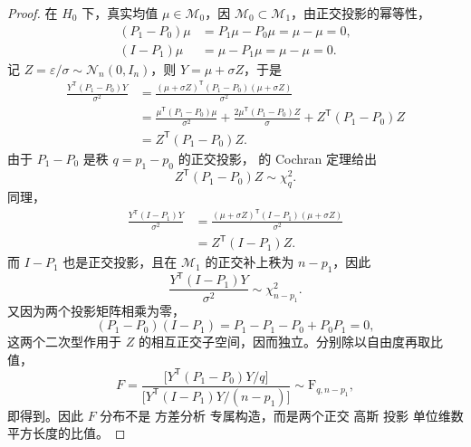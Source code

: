 \begin{proof}
在 $H_0$ 下，真实均值 $\mu\in\mathcal M_0$，因 $\mathcal M_0\subset\mathcal M_1$，由正交投影的幂等性，
\begin{align*}
(P_1-P_0)\mu&=P_1\mu-P_0\mu=\mu-\mu=0,\\
(I-P_1)\mu&=\mu-P_1\mu=\mu-\mu=0.
\end{align*}
记 $Z=\varepsilon/\sigma\sim\mathcal N_n(0,I_n)$，则 $Y=\mu+\sigma Z$，于是
\begin{align*}
\frac{Y^{\mathsf T}(P_1-P_0)Y}{\sigma^2}
&=\frac{(\mu+\sigma Z)^{\mathsf T}(P_1-P_0)(\mu+\sigma Z)}{\sigma^2}\\
&=\frac{\mu^{\mathsf T}(P_1-P_0)\mu}{\sigma^2}
+\frac{2\mu^{\mathsf T}(P_1-P_0)Z}{\sigma}
+Z^{\mathsf T}(P_1-P_0)Z\\
&=Z^{\mathsf T}(P_1-P_0)Z.
\end{align*}
由于 $P_1-P_0$ 是秩 $q=p_1-p_0$ 的正交投影， 的 Cochran 定理给出
\begin{equation*}
Z^{\mathsf T}(P_1-P_0)Z\sim\chi^2_q.
\end{equation*}
同理，
\begin{align*}
\frac{Y^{\mathsf T}(I-P_1)Y}{\sigma^2}
&=\frac{(\mu+\sigma Z)^{\mathsf T}(I-P_1)(\mu+\sigma Z)}{\sigma^2}\\
&=Z^{\mathsf T}(I-P_1)Z.
\end{align*}
而 $I-P_1$ 也是正交投影，且在 $\mathcal M_1$ 的正交补上秩为 $n-p_1$，因此
\begin{equation*}
\frac{Y^{\mathsf T}(I-P_1)Y}{\sigma^2}
\sim\chi^2_{n-p_1}.
\end{equation*}
又因为两个投影矩阵相乘为零，
\begin{equation*}
(P_1-P_0)(I-P_1)=P_1-P_1-P_0+P_0P_1=0,
\end{equation*}
这两个二次型作用于 $Z$ 的相互正交子空间，因而独立。分别除以自由度再取比值，
\begin{equation*}
F=\frac{\bigl[Y^{\mathsf T}(P_1-P_0)Y/q\bigr]}{\bigl[Y^{\mathsf T}(I-P_1)Y/(n-p_1)\bigr]}
\sim\mathrm F_{q,n-p_1},
\end{equation*}
即得到。因此 $F$ 分布不是 方差分析 专属构造，而是两个正交 高斯 投影 单位维数平方长度的比值。
\end{proof}

